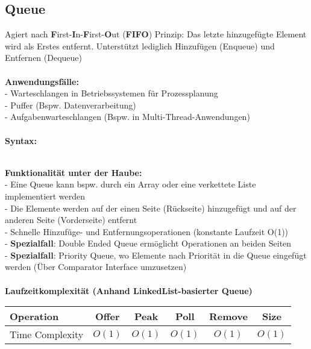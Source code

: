 \documentclass[../main.tex]{subfiles}
\begin{document}
	\subsection{Queue}
	Agiert nach \textbf{F}irst-\textbf{I}n-\textbf{F}irst-\textbf{O}ut (\textbf{FIFO}) Prinzip: Das letzte hinzugefügte Element wird als Erstes entfernt.
	Unterstützt lediglich Hinzufügen (Enqueue) und Entfernen (Dequeue)
	\\\\
	\textbf{Anwendungsfälle:}\\
	- Warteschlangen in Betriebssystemen für Prozessplanung\\
	- Puffer (Bspw. Datenverarbeitung)\\
	- Aufgabenwarteschlangen (Bspw. in Multi-Thread-Anwendungen)\\\\
	\textbf{Syntax:}
	 
	\\
	\textbf{Funktionalität unter der Haube:}\\
	- Eine Queue kann bspw. durch ein Array oder eine verkettete Liste implementiert werden\\
	- Die Elemente werden auf der einen Seite (Rückseite) hinzugefügt und auf der anderen Seite (Vorderseite) entfernt\\
	- Schnelle Hinzufüge- und Entfernungsoperationen (konstante Laufzeit O(1))\\
	- \textbf{Spezialfall}: Double Ended Queue ermöglicht Operationen an beiden Seiten\\
	- \textbf{Spezialfall}: Priority Queue, wo Elemente nach Priorität in die Queue eingefügt werden (Über Comparator Interface umzusetzen)\\\\
	\textbf{Laufzeitkomplexität (Anhand LinkedList-basierter Queue)}\\
	\begin{table}[ht]
		\centering
		\begin{tabular}{l *{5}{c}}
			\toprule
			Operation & Offer & Peak & Poll & Remove & Size  \\
			\midrule
			Time Complexity & $O(1)$ & $O(1)$ & $O(1)$ & $O(1)$ & $O(1)$\\
			\bottomrule
		\end{tabular}
	\end{table}
	\clearpage
	
\end{document}
